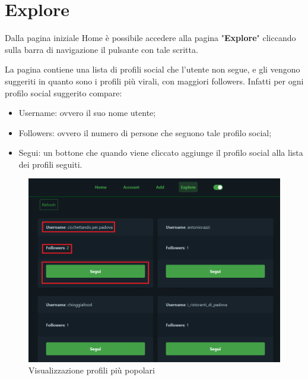 \section{Explore} {
    Dalla pagina iniziale Home è possibile accedere alla pagina "\textbf{Explore}" cliccando sulla barra di navigazione il pulsante con tale scritta.

    La pagina contiene una lista di profili social che l'utente non segue, e gli vengono suggeriti in quanto sono i profili più virali, con maggiori followers.
    Infatti per ogni profilo social suggerito compare:
    \begin{itemize}
        \item Username: ovvero il suo nome utente;
        \item Followers: ovvero il numero di persone che seguono tale profilo social;
        \item Segui: un bottone che quando viene cliccato aggiunge il profilo social alla lista dei profili seguiti.
    \end{itemize}

    \begin{figure}[H]
        \includegraphics[width=12cm]{sezioni/images/explore.png}
        \centering
        \caption{Visualizzazione profili più popolari}
    \end{figure}
}   

